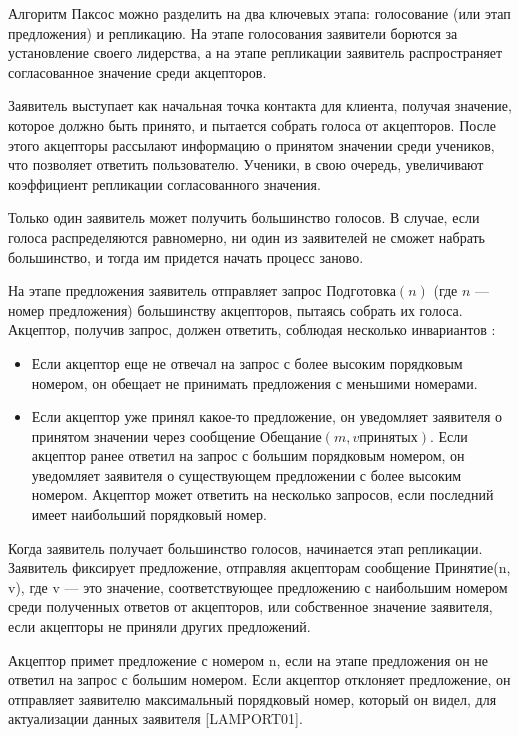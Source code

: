 Алгоритм Паксос можно разделить на два ключевых этапа: голосование (или этап
предложения) и репликацию. На этапе голосования заявители борются за установление
своего лидерства, а на этапе репликации заявитель распространяет согласованное
значение среди акцепторов.

Заявитель выступает как начальная точка контакта для клиента, получая значение,
которое должно быть принято, и пытается собрать голоса от акцепторов. После
этого акцепторы рассылают информацию о принятом значении среди учеников, что
позволяет ответить пользователю. Ученики, в свою очередь, увеличивают
коэффициент репликации согласованного значения.

Только один заявитель может получить большинство голосов. В случае, если
голоса распределяются равномерно, ни один из заявителей не сможет набрать
большинство, и тогда им придется начать процесс заново.

На этапе предложения заявитель отправляет запрос $Подготовка(n)$ (где $n$ —
номер предложения) большинству акцепторов, пытаясь собрать их голоса. Акцептор,
получив запрос, должен ответить, соблюдая несколько инвариантов \cite{lamport01}:

\begin{itemize}
    \item Если акцептор еще не отвечал на запрос с более высоким порядковым
        номером, он обещает не принимать предложения с меньшими номерами.
    \item Если акцептор уже принял какое-то предложение, он уведомляет
        заявителя о принятом значении через сообщение $Обещание(m, vпринятых)$.
    Если акцептор ранее ответил на запрос с большим порядковым номером, он уведомляет заявителя о существующем предложении с более высоким номером.
    Акцептор может ответить на несколько запросов, если последний имеет наибольший порядковый номер.
\end{itemize}

Когда заявитель получает большинство голосов, начинается этап репликации. Заявитель фиксирует предложение, отправляя акцепторам сообщение Принятие(n, v), где v — это значение, соответствующее предложению с наибольшим номером среди полученных ответов от акцепторов, или собственное значение заявителя, если акцепторы не приняли других предложений.

Акцептор примет предложение с номером n, если на этапе предложения он не ответил на запрос с большим номером. Если акцептор отклоняет предложение, он отправляет заявителю максимальный порядковый номер, который он видел, для актуализации данных заявителя [LAMPORT01].

